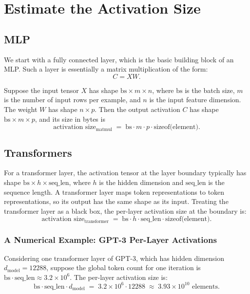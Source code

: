 \section{Estimate the Activation Size}
\subsection{MLP}
We start with a fully connected layer, which is the basic building block of an MLP. Such a layer is essentially a matrix multiplication of the form: \[C = X W.\]

Suppose the input tensor $X$ has shape $\text{bs} \times m \times n$, where $\text{bs}$ is the batch size, $m$ is the number of input rows per example, and $n$ is the input feature dimension. The weight $W$ has shape $n \times p$. Then the output activation $C$ has shape $\text{bs} \times m \times p$, and its size in bytes is
\[
    \text{activation size}_{\text{matmul}}
    \;=\; \text{bs} \cdot m \cdot p \cdot \text{sizeof(element)}.
\]

\subsection{Transformers}

For a transformer layer, the activation tensor at the layer boundary typically has shape $\text{bs} \times h \times \text{seq\_len}$, where $h$ is the hidden dimension and $\text{seq\_len}$ is the sequence length. A transformer layer maps token representations to token representations, so its output has the same shape as its input. Treating the transformer layer as a black box, the per-layer activation size at the boundary is:
\[
    \text{activation size}_{\text{transformer}}
    \;=\; \text{bs} \cdot h \cdot \text{seq\_len} \cdot \text{sizeof(element)}.
\]

\subsubsection{A Numerical Example: GPT-3 Per-Layer Activations}

Considering one transformer layer of GPT-3, which has hidden dimension $d_{\text{model}} = 12288$, suppose the global token count for one iteration is $\text{bs} \cdot \text{seq\_len} \approx 3.2 \times 10^{6}$. The per-layer activation size is:
\[
    \text{bs} \cdot \text{seq\_len} \cdot d_{\text{model}}
    \;=\; 3.2 \times 10^{6} \cdot 12288
    \;\approx\; 3.93 \times 10^{10} \text{ elements}.
\]

